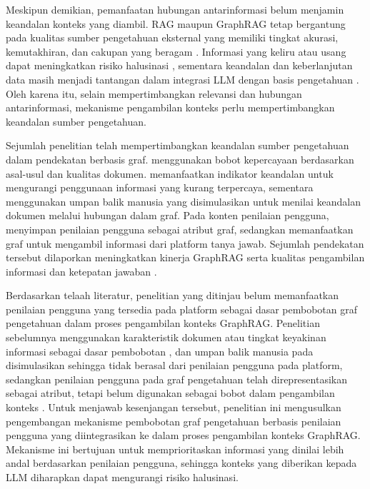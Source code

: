 Meskipun demikian, pemanfaatan hubungan antarinformasi belum menjamin keandalan konteks yang diambil. RAG maupun GraphRAG tetap bergantung pada kualitas sumber pengetahuan eksternal yang memiliki tingkat akurasi, kemutakhiran, dan cakupan yang beragam \autocite{WangXL2026}. Informasi yang keliru atau usang dapat meningkatkan risiko halusinasi \autocite{Huang2025}, sementara keandalan dan keberlanjutan data masih menjadi tantangan dalam integrasi LLM dengan basis pengetahuan \autocite{Yang2025}. Oleh karena itu, selain mempertimbangkan relevansi dan hubungan antarinformasi, mekanisme pengambilan konteks perlu mempertimbangkan keandalan sumber pengetahuan.

Sejumlah penelitian telah mempertimbangkan keandalan sumber pengetahuan dalam pendekatan berbasis graf. \textcite{Shi2026} menggunakan bobot kepercayaan berdasarkan asal-usul dan kualitas dokumen. \textcite{Asghari2026} memanfaatkan indikator keandalan untuk mengurangi penggunaan informasi yang kurang terpercaya, sementara \textcite{LiTrustProp2026} menggunakan umpan balik manusia yang disimulasikan untuk menilai keandalan dokumen melalui hubungan dalam graf. Pada konten penilaian pengguna, \textcite{Kleybolte2026} menyimpan penilaian pengguna sebagai atribut graf, sedangkan \textcite{Banerjee2024} memanfaatkan graf untuk mengambil informasi dari platform tanya jawab. Sejumlah pendekatan tersebut dilaporkan meningkatkan kinerja GraphRAG \autocite{Shi2026} serta kualitas pengambilan informasi dan ketepatan jawaban \autocite{LiTrustProp2026}.

Berdasarkan telaah literatur, penelitian yang ditinjau belum memanfaatkan penilaian pengguna yang tersedia pada platform sebagai dasar pembobotan graf pengetahuan dalam proses pengambilan konteks GraphRAG. Penelitian sebelumnya menggunakan karakteristik dokumen atau tingkat keyakinan informasi sebagai dasar pembobotan \autocite{Shi2026, Asghari2026}, dan umpan balik manusia pada \textcite{LiTrustProp2026} disimulasikan sehingga tidak berasal dari penilaian pengguna pada platform, sedangkan penilaian pengguna pada graf pengetahuan telah direpresentasikan sebagai atribut, tetapi belum digunakan sebagai bobot dalam pengambilan konteks \autocite{Kleybolte2026, Banerjee2024}. Untuk menjawab kesenjangan tersebut, penelitian ini mengusulkan pengembangan mekanisme pembobotan graf pengetahuan berbasis penilaian pengguna yang diintegrasikan ke dalam proses pengambilan konteks GraphRAG. Mekanisme ini bertujuan untuk memprioritaskan informasi yang dinilai lebih andal berdasarkan penilaian pengguna, sehingga konteks yang diberikan kepada LLM diharapkan dapat mengurangi risiko halusinasi.


